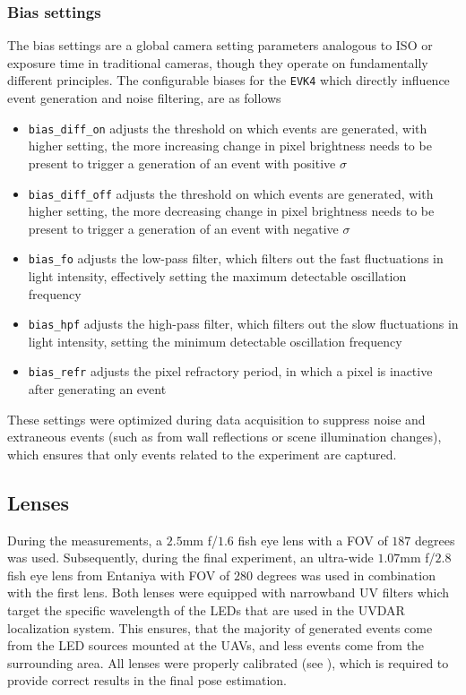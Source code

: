 \subsubsection{Bias settings}
The bias settings are a global camera setting parameters analogous to ISO or exposure time in traditional cameras, though they operate on fundamentally
different principles.
The configurable biases for the \texttt{EVK4} which directly influence event generation and noise filtering, are as follows\cite{dilmaghani2022controlevaluationeventcameras}
\begin{itemize}
    \item \texttt{bias\_diff\_on} adjusts the threshold on which events are generated, with higher setting, the more increasing change in pixel brightness needs to be present to trigger a generation of an event with positive $\sigma$
    \item \texttt{bias\_diff\_off} adjusts the threshold on which events are generated, with higher setting, the more decreasing change in pixel brightness needs to be present to trigger a generation of an event with negative $\sigma$
    \item \texttt{bias\_fo} adjusts the low-pass filter, which filters out the fast fluctuations in light intensity, effectively setting the maximum detectable oscillation frequency
    \item \texttt{bias\_hpf} adjusts the high-pass filter, which filters out the slow fluctuations in light intensity, setting the minimum detectable oscillation frequency
    \item \texttt{bias\_refr} adjusts the pixel refractory period, in which a pixel is inactive after generating an event
\end{itemize}
These settings were optimized during data acquisition to suppress noise and extraneous events (such as from wall reflections or scene illumination changes), which
ensures that only events related to the experiment are captured.

\subsection{Lenses}
During the measurements, a $2.5$mm f/$1.6$ fish eye lens with a \ac{FOV} of $187$ degrees was used. Subsequently, during the final experiment, an ultra-wide $1.07$mm f/$2.8$ fish eye lens from Entaniya with \ac{FOV} of $280$ degrees was used in combination with the first lens.
Both lenses were equipped with narrowband \ac{UV} filters which target the specific wavelength of the \ac{LED}s that are used in the UVDAR localization system.
This ensures, that the majority of generated events come from the \ac{LED} sources mounted at the \ac{UAV}s, and less events come from the surrounding area.
All lenses were properly calibrated (see ), which is required to provide correct results in the final pose estimation.

